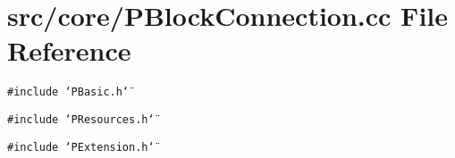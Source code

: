 \section{src/core/PBlock\-Connection.cc File Reference}
\label{PBlockConnection_8cc}


{\tt \#include \char`\"{}PBasic.h\char`\"{}}\par
{\tt \#include \char`\"{}PResources.h\char`\"{}}\par
{\tt \#include \char`\"{}PExtension.h\char`\"{}}\par
